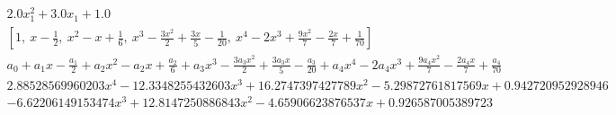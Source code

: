 \documentclass[preprint,12pt]{elsarticle}
\begin{document}
\begin{eqnarray}
		2.0 x_{1}^{2} + 3.0 x_{1} + 1.0 \\
		\left[ 1, \  x - \frac{1}{2}, \  x^{2} - x + \frac{1}{6}, \  x^{3} - \frac{3 x^{2}}{2} + \frac{3 x}{5} - \frac{1}{20}, \  x^{4} - 2 x^{3} + \frac{9 x^{2}}{7} - \frac{2 x}{7} + \frac{1}{70}\right] \\
		a_{0} + a_{1} x - \frac{a_{1}}{2} + a_{2} x^{2} - a_{2} x + \frac{a_{2}}{6} + a_{3} x^{3} - \frac{3 a_{3} x^{2}}{2} + \frac{3 a_{3} x}{5} - \frac{a_{3}}{20} + a_{4} x^{4} - 2 a_{4} x^{3} + \frac{9 a_{4} x^{2}}{7} - \frac{2 a_{4} x}{7} + \frac{a_{4}}{70} \\
		2.88528569960203 x^{4} - 12.3348255432603 x^{3} + 16.2747397427789 x^{2} - 5.29872761817569 x + 0.942720952928946 \\
		- 6.62206149153474 x^{3} + 12.8147250886843 x^{2} - 4.65906623876537 x + 0.926587005389723
	\end{eqnarray}
\end{document}
